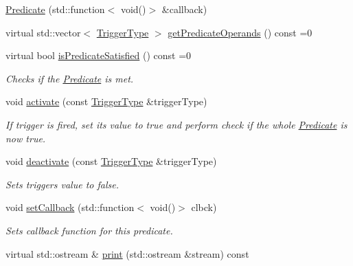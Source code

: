 \begin{DoxyCompactItemize}
\item 
\hyperlink{classPredicate_ab6f0b27135d9f08f97bf79649e26f9c4}{Predicate} (std\+::function$<$ void()$>$ \&callback)
\item 
virtual std\+::vector$<$ \hyperlink{structTriggerType}{Trigger\+Type} $>$ \hyperlink{classPredicate_ae7e2eb0f72d66030168a0995fa9f05a0}{get\+Predicate\+Operands} () const =0
\item 
virtual bool \hyperlink{classPredicate_a5734faf53a034e3521f6305c1b3c02d1}{is\+Predicate\+Satisfied} () const =0\hypertarget{classPredicate_a5734faf53a034e3521f6305c1b3c02d1}{}\label{classPredicate_a5734faf53a034e3521f6305c1b3c02d1}

\begin{DoxyCompactList}\small\item\em Checks if the \hyperlink{classPredicate}{Predicate} is met. \end{DoxyCompactList}\item 
void \hyperlink{classPredicate_a8ff5d1b869af329aec0976512141ac45}{activate} (const \hyperlink{structTriggerType}{Trigger\+Type} \&trigger\+Type)\hypertarget{classPredicate_a8ff5d1b869af329aec0976512141ac45}{}\label{classPredicate_a8ff5d1b869af329aec0976512141ac45}

\begin{DoxyCompactList}\small\item\em If trigger is fired, set its value to true and perform check if the whole \hyperlink{classPredicate}{Predicate} is now true. \end{DoxyCompactList}\item 
void \hyperlink{classPredicate_a13fcab312663a3353bba777d497cf407}{deactivate} (const \hyperlink{structTriggerType}{Trigger\+Type} \&trigger\+Type)\hypertarget{classPredicate_a13fcab312663a3353bba777d497cf407}{}\label{classPredicate_a13fcab312663a3353bba777d497cf407}

\begin{DoxyCompactList}\small\item\em Sets trigger\textquotesingle{}s value to false. \end{DoxyCompactList}\item 
void \hyperlink{classPredicate_a547aeb6a59cff25e6040a742bda86f66}{set\+Callback} (std\+::function$<$ void()$>$ clbck)\hypertarget{classPredicate_a547aeb6a59cff25e6040a742bda86f66}{}\label{classPredicate_a547aeb6a59cff25e6040a742bda86f66}

\begin{DoxyCompactList}\small\item\em Sets callback function for this predicate. \end{DoxyCompactList}\item 
virtual std\+::ostream \& \hyperlink{classPredicate_ad7c534404b8b03573287bc8f7e7d5f82}{print} (std\+::ostream \&stream) const \hypertarget{classPredicate_ad7c534404b8b03573287bc8f7e7d5f82}{}\label{classPredicate_ad7c534404b8b03573287bc8f7e7d5f82}


\end{DoxyCompactItemize}
